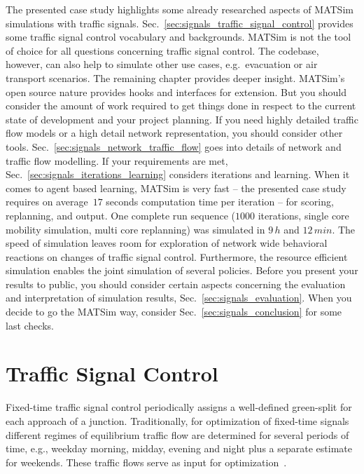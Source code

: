The presented case study highlights some already researched aspects of MATSim simulations with traffic signals. 
Sec.~\ref{sec:signals_traffic_signal_control} provides some traffic signal control vocabulary and backgrounds.  
MATSim is not the tool of choice for all questions concerning traffic signal control. 
The codebase, however, can also help to simulate other use cases, e.g.~evacuation or air transport scenarios. 
The remaining chapter provides deeper insight.  
MATSim's open source nature provides hooks and interfaces for extension. 
But you should consider the amount of work required to get things done in respect to the current state of development and your project planning. 
If you need highly detailed traffic flow models or a high detail network representation, you should consider other tools. 
Sec.~\ref{sec:signals_network_traffic_flow} goes into details of network and traffic flow modelling. 
If your requirements are met, Sec.~\ref{sec:signals_iterations_learning} considers iterations and learning. 
When it comes to agent based learning, MATSim is very fast -- the presented case study requires on average~$17$ seconds computation time per iteration -- for scoring, replanning, and output. One complete run sequence ($1000$ iterations, single core mobility simulation, multi core replanning) was simulated in $9 \, h$ and $12 \, min$. 
The speed of simulation leaves room for exploration of network wide behavioral reactions on changes of traffic signal control. 
Furthermore, the resource efficient simulation enables the joint simulation of several policies. 
Before you present your results to public, you should consider certain aspects concerning the  evaluation and interpretation of simulation results, Sec.~\ref{sec:signals_evaluation}. 
When you decide to go the MATSim way, consider Sec.~\ref{sec:signals_conclusion} for some last checks. 



\section{Traffic Signal Control}



Fixed-time traffic signal control periodically assigns a well-defined green-split for each approach of a junction. 
Traditionally, for optimization of fixed-time signals different regimes of equilibrium traffic flow are determined for several periods of time, e.g., weekday morning, midday, evening and night plus a separate estimate for weekends.   
These traffic flows serve as input for optimization~\citep[e.g.~][]{Webster1961SignalSettings,Allsop1972SignalizedJunctionCapacity,Allsop1991SignalsStageBased,Robertson1969Transyt}.  

